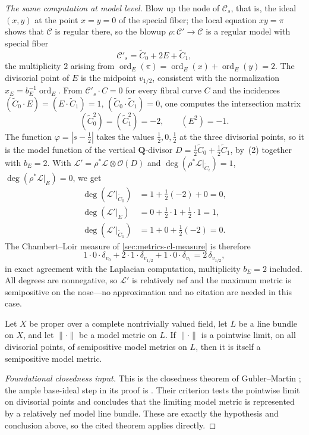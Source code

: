 \begin{example}
\emph{The same computation at model level.} Blow up the node of
$\mathcal C_s$, that is, the ideal $(x,y)$ at the point $x=y=0$ of the
special fiber; the local equation $xy=\pi$ shows that $\mathcal C$ is
regular there, so the blowup $\rho:\mathcal C'\to\mathcal C$ is a regular
model with special fiber
\[
 \mathcal C'_s=\widetilde C_0+2E+\widetilde C_1,
\]
the multiplicity $2$ arising from
$\operatorname{ord}_E(\pi)=\operatorname{ord}_E(x)+\operatorname{ord}_E(y)=2$.
The divisorial point of $E$ is the midpoint $v_{1/2}$, consistent with
the normalization $x_E=b_E^{-1}\operatorname{ord}_E$. From
$\mathcal C'_s\cdot C=0$ for every fibral curve $C$ and the incidences
$(\widetilde C_0\cdot E)=(E\cdot\widetilde C_1)=1$,
$(\widetilde C_0\cdot\widetilde C_1)=0$, one computes the intersection
matrix
\[
 (\widetilde C_0^2)=(\widetilde C_1^2)=-2,\qquad (E^2)=-1 .
\]
The function $\varphi=|s-\tfrac12|$ takes the values
$\tfrac12,0,\tfrac12$ at the three divisorial points, so it is the model
function of the vertical $\mathbf Q$-divisor
$D=\tfrac12\widetilde C_0+\tfrac12\widetilde C_1$, by
\,(2) together with
$b_E=2$. With $\mathcal L'=\rho^*\mathcal L\otimes\mathcal O(D)$ and
$\deg(\rho^*\mathcal L|_{\widetilde C_i})=1$,
$\deg(\rho^*\mathcal L|_E)=0$, we get
\[
 \begin{aligned}
 \deg(\mathcal L'|_{\widetilde C_0})
 &=1+\tfrac12(-2)+0=0,\\
 \deg(\mathcal L'|_{E})&=0+\tfrac12\cdot1+\tfrac12\cdot1=1,\\
 \deg(\mathcal L'|_{\widetilde C_1})&=1+0+\tfrac12(-2)=0 .
 \end{aligned}
\]
The Chambert--Loir measure of \cref{sec:metrics-cl-measure} is therefore
\[
 1\cdot0\cdot\delta_{v_0}+2\cdot1\cdot\delta_{v_{1/2}}
 +1\cdot0\cdot\delta_{v_1}
 =2\,\delta_{v_{1/2}},
\]
in exact agreement with the Laplacian computation, multiplicity $b_E=2$
included. All degrees are nonnegative, so $\mathcal L'$ is relatively nef
and the maximum metric is semipositive on the nose---no approximation and
no citation are needed in this case.
\end{example}

\begin{theorem}\label{thm:model-semipositive-closed}
Let $X$ be proper over a complete nontrivially valued field, let $L$ be a
line bundle on $X$, and let $\|\cdot\|$ be a model metric on $L$. If
$\|\cdot\|$ is a pointwise limit, on all divisorial points, of semipositive
model metrics on $L$, then it is itself a semipositive model metric.
\end{theorem}
\begin{proof}[Foundational closedness input]
This is the closedness theorem of Gubler--Martin
\cite[Theorems~1.3 and 5.5]{GM19}; the ample base-ideal step in its proof is
\cite[Proposition~5.1]{GM19}.  Their criterion tests the pointwise limit on
divisorial points and concludes that the limiting model metric is represented
by a relatively nef model line bundle.  These are exactly the hypothesis and
conclusion above, so the cited theorem applies directly.

\end{proof}

